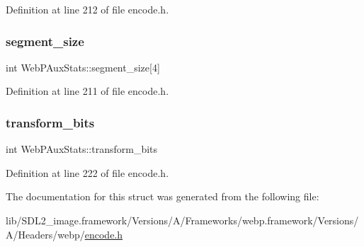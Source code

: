 Definition at line 212 of file encode.\+h.

\mbox{\label{struct_web_p_aux_stats_a2f5638ce6b240cf1e00f886e0dc3ba4d}} 
\subsubsection{\texorpdfstring{segment\_size}{segment\_size}}
{\footnotesize\ttfamily int Web\+P\+Aux\+Stats\+::segment\+\_\+size\mbox{[}4\mbox{]}}



Definition at line 211 of file encode.\+h.

\mbox{\label{struct_web_p_aux_stats_a5bbb98600ce3b08356be01b72b8c3d9c}} 
\subsubsection{\texorpdfstring{transform\_bits}{transform\_bits}}
{\footnotesize\ttfamily int Web\+P\+Aux\+Stats\+::transform\+\_\+bits}



Definition at line 222 of file encode.\+h.



The documentation for this struct was generated from the following file\+:\begin{DoxyCompactItemize}
\item 
lib/\+S\+D\+L2\+\_\+image.\+framework/\+Versions/\+A/\+Frameworks/webp.\+framework/\+Versions/\+A/\+Headers/webp/\mbox{\hyperlink{encode_8h}{encode.\+h}}\end{DoxyCompactItemize}
